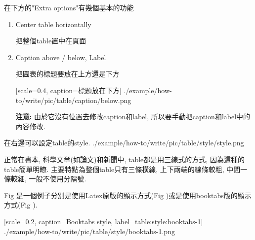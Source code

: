 \newpage
{}

  在下方的"Extra options"有幾個基本的功能

\begin{enumerate}

  \item
  {
  Center table horizontally

  把整個table置中在頁面

  } %

  \label{chapter:how-to:write:table:label-example}
  \item
  {
  Caption above / below, Label

  把圖表的標題要放在上方還是下方

    {
      [scale=0.4,
      caption={標題放在下方}]
      {./example/how-to/write/pic/table/caption/below.png}
    }

  {\bf 注意:} 由於它沒有位置去修改caption和label, 所以要手動把caption和label中的內容修改.
  } %
\end{enumerate}

\newpage
{}

  在右邊可以設定table的style.
  \InsertCenterImage
    {./example/how-to/write/pic/table/style/style.png}

   正常在書本, 科學文章(如論文)和新聞中, table都是用三線式的方式, 因為這種的table簡單明瞭. 主要特點為整個table只有三條橫線, 上下兩端的線條較粗, 中間一條較細, 一般不使用分隔號.

  Fig 是一個例子分別是使用Latex原版的顯示方式(Fig )或是使用booktabs版的顯示方式(Fig ).

    {
      [scale=0.2,
      caption={Booktabs style},
      label={table:style:booktabs-1}]
      {./example/how-to/write/pic/table/style/booktabs-1.png}
    }

